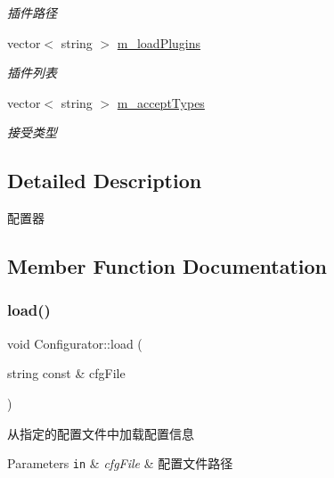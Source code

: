 \begin{DoxyCompactItemize}
\begin{DoxyCompactList}\small\item\em 插件路径 \end{DoxyCompactList}\item 
\mbox{\label{class_configurator_ade960dc8653e08ba447b18fa1561cbef}} 
vector$<$ string $>$ \hyperlink{class_configurator_ade960dc8653e08ba447b18fa1561cbef}{m\+\_\+load\+Plugins}
\begin{DoxyCompactList}\small\item\em 插件列表 \end{DoxyCompactList}\item 
\mbox{\label{class_configurator_a6683f77519f28b12e3296a4457da502b}} 
vector$<$ string $>$ \hyperlink{class_configurator_a6683f77519f28b12e3296a4457da502b}{m\+\_\+accept\+Types}
\begin{DoxyCompactList}\small\item\em 接受类型 \end{DoxyCompactList}\end{DoxyCompactItemize}


\subsection{Detailed Description}
配置器 

\subsection{Member Function Documentation}
\mbox{\label{class_configurator_a5c8b62b3619de64a81b3877a4498f6d8}} 
\subsubsection{\texorpdfstring{load()}{load()}}
{\footnotesize\ttfamily void Configurator\+::load (\begin{DoxyParamCaption}\item[{string const \&}]{cfg\+File }\end{DoxyParamCaption})}



从指定的配置文件中加载配置信息 


\begin{DoxyParams}[1]{Parameters}
\mbox{\tt in}  & {\em cfg\+File} & 配置文件路径 \\
\hline
\end{DoxyParams}


